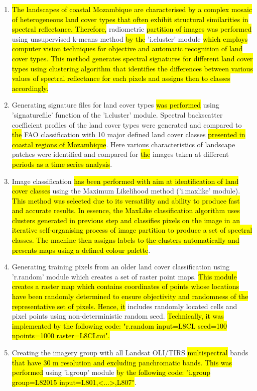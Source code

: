 \documentclass[coasts,article,submit,pdftex,moreauthors]{Definitions/mdpi}
\begin{document}
\begin{enumerate}
  \item \hl{The landscapes of coastal Mozambique are characterised by a complex mosaic of heterogeneous land cover types that often exhibit structural similarities in spectral reflectance. Therefore, }radiometric \hl{partition of images was performed} using unsupervised k-means method \hl{by the }'i.cluster' module \hl{which employs computer vision techniques for objective and automatic recognition of land cover types. This method generates spectral signatures for different land cover types using clustering algorithm that identifies the differences between various values of spectral reflectance for each pixels and assigns then to classes accordingly.}
    \item Generating signature files for land cover types \hl{was performed }using 'signaturefile' function of the 'i.cluster' module. Spectral backscatter coefficient profiles of the land cover types were generated and compared to \hl{the }FAO classification with 10 major defined land cover classes \hl{ presented in coastal regions of Mozambique}. Here various characteristics of landscape patches were identified and compared for \hl{the }images taken at different \hl{periods as a time series analysis}.
  \item Image classification \hl{has been performed with aim at identification of land cover classes }using the Maximum Likelihood method ('i.maxlike' module). \hl{This method was selected due to its versatility and ability to produce fast and accurate results. In essence, the MaxLike classification algorithm uses clusters generated in previous step and classifies pixels on the image in an iterative self-organising process of image partition to produce a set of spectral classes. The machine then assigns labels to the clusters automatically and presents maps using a defined colour palette}.
  \item Generating training pixels from an older land cover classification using 'r.random' module which creates a set of raster point maps. \hl{This module creates a raster map which contains coordinates of points whose locations have been randomly determined to ensure objectivity and randomness of the representative set of pixels. Hence, it } includes randomly located cells and pixel points using non-deterministic random seed. \hl{Technically, it was implemented by the following code: "r.random input=L8CL seed=100 npoints=1000 raster=L8CLroi".}
  \item Creating the imagery group with all Landsat OLI/TIRS \hl{multispectral }bands \hl{that have 30 m resolution and excluding panchromatic bands. This was performed }using 'i.group' module \hl{by the following code: "i.group group=L82015 input=L801,<...>,L807"}. 

\end{enumerate}
\end{document}
